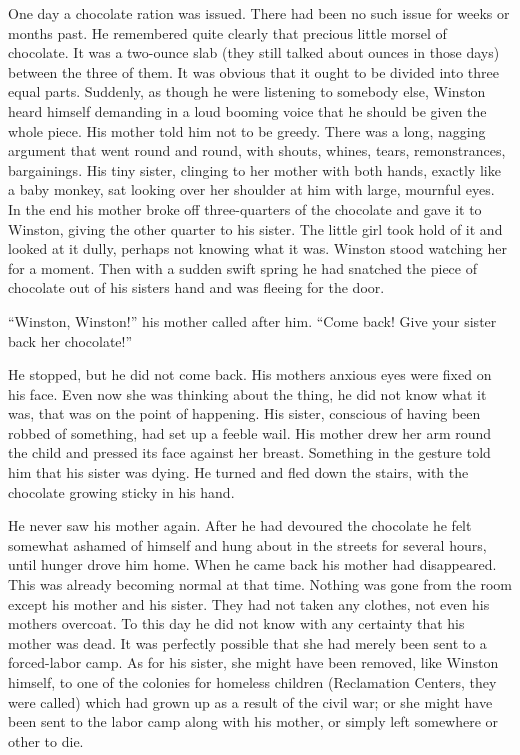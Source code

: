 One day a chocolate ration was issued. There had been no such issue for
weeks or months past. He remembered quite clearly that precious little
morsel of chocolate. It was a two-ounce slab (they still talked about
ounces in those days) between the three of them. It was obvious that it
ought to be divided into three equal parts. Suddenly, as though he were
listening to somebody else, Winston heard himself demanding in a loud
booming voice that he should be given the whole piece. His mother told
him not to be greedy. There was a long, nagging argument that went round
and round, with shouts, whines, tears, remonstrances, bargainings. His
tiny sister, clinging to her mother with both hands, exactly like a baby
monkey, sat looking over her shoulder at him with large, mournful eyes.
In the end his mother broke off three-quarters of the chocolate and gave
it to Winston, giving the other quarter to his sister. The little girl
took hold of it and looked at it dully, perhaps not knowing what it was.
Winston stood watching her for a moment. Then with a sudden swift spring
he had snatched the piece of chocolate out of his
sister\textquotesingle s hand and was fleeing for the door.

``Winston, Winston!'' his mother called after him. ``Come back! Give your
sister back her chocolate!''

He stopped, but he did not come back. His mother\textquotesingle s
anxious eyes were fixed on his face. Even now she was thinking about the
thing, he did not know what it was, that was on the point of happening.
His sister, conscious of having been robbed of something, had set up a
feeble wail. His mother drew her arm round the child and pressed its
face against her breast. Something in the gesture told him that his
sister was dying. He turned and fled down the stairs, with the chocolate
growing sticky in his hand.

He never saw his mother again. After he had devoured the chocolate he
felt somewhat ashamed of himself and hung about in the streets for
several hours, until hunger drove him home. When he came back his mother
had disappeared. This was already becoming normal at that time. Nothing
was gone from the room except his mother and his sister. They had not
taken any clothes, not even his mother\textquotesingle s overcoat. To
this day he did not know with any certainty that his mother was dead. It
was perfectly possible that she had merely been sent to a forced-labor
camp. As for his sister, she might have been removed, like Winston
himself, to one of the colonies for homeless children (Reclamation
Centers, they were called) which had grown up as a result of the civil
war; or she might have been sent to the labor camp along with his
mother, or simply left somewhere or other to die.

